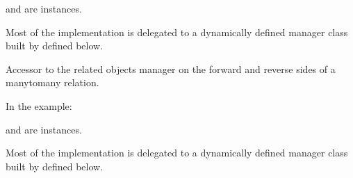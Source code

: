 \documentclass[letterpaper,10pt,english]{sphinxmanual}
\begin{document}
\begin{fulllineitems}
\begin{fulllineitems}
\sphinxAtStartPar
{} and  are 
instances.

\sphinxAtStartPar
Most of the implementation is delegated to a dynamically defined manager
class built by  defined below.

\end{fulllineitems}


\begin{fulllineitems}
\label{\detokenize{app:app.models.io_type.objects}}
\pysigstartsignatures
{}
\pysigstopsignatures
\end{fulllineitems}


\begin{fulllineitems}
\label{\detokenize{app:app.models.io_type.resources_categories}}
\pysigstartsignatures
{}
\pysigstopsignatures
\sphinxAtStartPar
Accessor to the related objects manager on the forward and reverse sides of
a many\sphinxhyphen{}to\sphinxhyphen{}many relation.

\sphinxAtStartPar
In the example:

\begin{sphinxVerbatim}[commandchars=\\\{\}]
 
       
\end{sphinxVerbatim}

\sphinxAtStartPar
{} and  are 
instances.

\sphinxAtStartPar
Most of the implementation is delegated to a dynamically defined manager
class built by  defined below.

\end{fulllineitems}


\end{fulllineitems}
\end{document}
